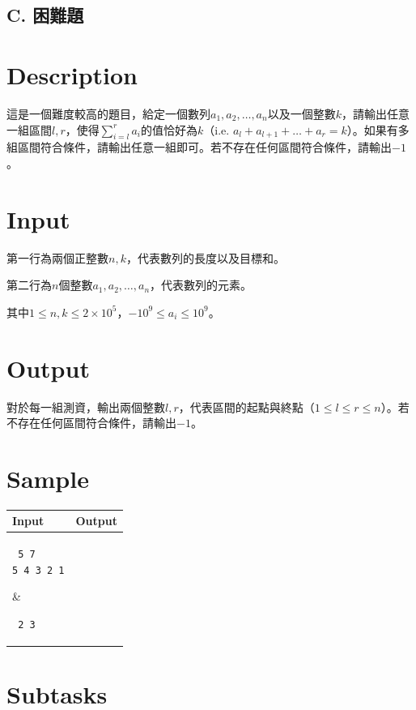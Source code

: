 \documentclass[11pt,a4paper]{article}
\begin{document}
\begin{center}
\section*{C. 困難題}
\end{center}

\section*{Description}

這是一個難度較高的題目，給定一個數列$a_1, a_2, \ldots, a_n$以及一個整數$k$，請輸出任意一組區間$l, r$，使得$\displaystyle\sum_{i=l}^r a_i$的值恰好為$k$（i.e. $a_l + a_{l+1} + \ldots + a_r = k$）。如果有多組區間符合條件，請輸出任意一組即可。若不存在任何區間符合條件，請輸出$-1$。

\section*{Input}
第一行為兩個正整數$n, k$，代表數列的長度以及目標和。

第二行為$n$個整數$a_1, a_2, \ldots, a_n$，代表數列的元素。

其中$1\le n, k\leq 2\times 10^5$，$-10^9 \le a_i \le 10^9$。

\section*{Output}

對於每一組測資，輸出兩個整數$l, r$，代表區間的起點與終點（$1\le l \le r \le n$）。若不存在任何區間符合條件，請輸出$-1$。


\section*{Sample}
\begin{longtable}[!h]{|p{}|p{}|}
\hline
\textbf {Input}	& \textbf {Output} \\
\hline
\parbox[t]{0.5\textwidth} %
{ \tt
5 7\\
5 4 3 2 1\\
} &
\parbox[t]{0.5\textwidth}
{ \tt
2 3\\
} \\
\hline
\end{longtable}


\section*{Subtasks}
\end{document}
